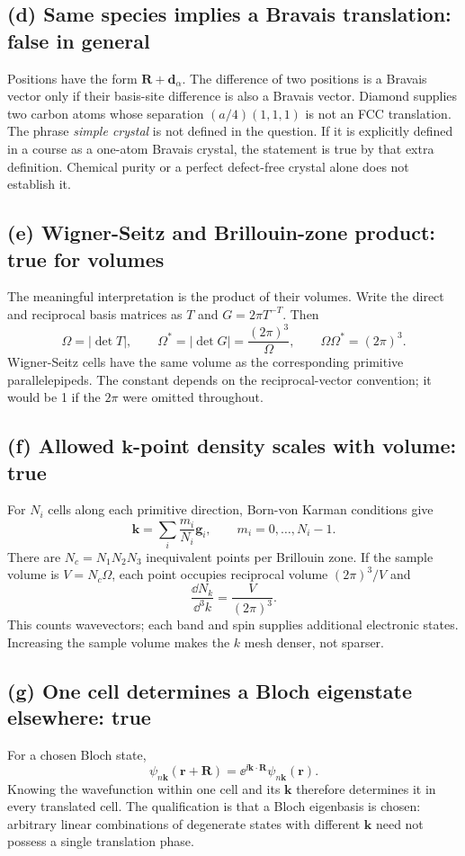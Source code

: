 \subsection*{(d) Same species implies a Bravais translation: false in general}
Positions have the form $\mathbf R+\mathbf d_\alpha$. The difference of two positions is a Bravais vector only if their basis-site difference is also a Bravais vector. Diamond supplies two carbon atoms whose separation $(a/4)(1,1,1)$ is not an FCC translation.
The phrase \emph{simple crystal} is not defined in the question. If it is explicitly defined in a course as a one-atom Bravais crystal, the statement is true by that extra definition. Chemical purity or a perfect defect-free crystal alone does not establish it.

\subsection*{(e) Wigner-Seitz and Brillouin-zone product: true for volumes}
The meaningful interpretation is the product of their volumes. Write the direct and reciprocal basis matrices as $T$ and $G=2\pi T^{-T}$. Then
\[
\Omega=|\det T|,\qquad
\Omega^*=|\det G|=\frac{(2\pi)^3}{\Omega},\qquad
\boxed{\Omega\Omega^*=(2\pi)^3.}
\]
Wigner-Seitz cells have the same volume as the corresponding primitive parallelepipeds. The constant depends on the reciprocal-vector convention; it would be 1 if the $2\pi$ were omitted throughout.

\subsection*{(f) Allowed $\mathbf k$-point density scales with volume: true}
For $N_i$ cells along each primitive direction, Born-von Karman conditions give
\[
\mathbf k=\sum_i\frac{m_i}{N_i}\mathbf g_i,
\qquad m_i=0,\ldots,N_i-1.
\]
There are $N_c=N_1N_2N_3$ inequivalent points per Brillouin zone. If the sample volume is $V=N_c\Omega$, each point occupies reciprocal volume $(2\pi)^3/V$ and
\[
\boxed{\frac{\dd N_k}{\dd^3k}=\frac{V}{(2\pi)^3}.}
\]
This counts wavevectors; each band and spin supplies additional electronic states. Increasing the sample volume makes the $k$ mesh denser, not sparser.

\subsection*{(g) One cell determines a Bloch eigenstate elsewhere: true}
For a chosen Bloch state,
\[
\psi_{n\mathbf k}(\mathbf r+\mathbf R)=
\ee^{\ii\mathbf k\cdot\mathbf R}\psi_{n\mathbf k}(\mathbf r).
\]
Knowing the wavefunction within one cell and its $\mathbf k$ therefore determines it in every translated cell. The qualification is that a Bloch eigenbasis is chosen: arbitrary linear combinations of degenerate states with different $\mathbf k$ need not possess a single translation phase.

